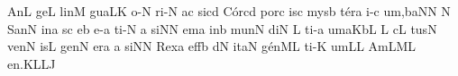 \Internote
\nosolesmescustos
\initiumgregorianum
%
\sgn {}An\punctum L\egn
\sgn ge{}\punctum L\egn
\spatium
\sgn l{i}n\punctum M\egn
\sgn gua\clivis LK\egn
\spatium
{}o{-}\punctum N\egn
\sgn ri{-}\punctum N\egn
{}\pes ac\egn
\sgn si{}\punctum c\augmentum d\egn
\spatium
\divisiominima
\spatium
\sgn C{\'o}r\pes cd\egn
\sgn por\punctum c\egn
\sgn {}is\punctum c\egn
\spatium
\sgn mys\punctum b\egn
\sgn t{\'e}r\punctum a\egn
\sgn {}i{-}\punctum c\egn
\sgn {}u{m,}\climacus baN\augmentum N\egn
\spatium
\divisiominor
\spatium
\custos N
\lineaproxima
\sgn San\punctum N\egn
{}in\punctum a\egn
\sgn {}{\'\i}s\punctum c\egn
{}e{}\punctum b\egn
\spatium
{}e{-}\punctum a\egn
\sgn ti{-}\punctum N\egn
{}\punctum a\egn
\sgn si{}\punctum N\augmentum N\egn
\spatium
\divisiominima
\spatium
em\punctum a\egn
\spatium
\sgn {}in\punctum b\egn
\spatium
\sgn m{u}n\punctum N\egn
\sgn di{}\punctum N\egn
\spatium
{}\punctum L\egn
\sgn ti{-}\punctum a\egn
\sgn {}u{m}\clivis aK\augmentumduplex bL\egn
\spatium
\divisiominor
\spatium
\custos L
\lineaproxima
c\punctum L\egn
\sgn tus\punctum N\egn
\spatium
\sgn v{e}n\punctum N\egn
{}is\punctum L\egn
\spatium
\sgn gen\punctum N\egn
\sgn {}er\punctum a\egn
{}\punctum a\egn
\sgn si{}\punctum N\augmentum N\egn
\spatium
\divisiominima
\spatium
\sgn Rex\punctum a\egn
\spatium
\sgn {}e{ff}\punctum b\egn
{}d\punctum N\egn
\sgn {}it\clivis aN\egn
\spatium
\sgn g{\'e}n\clivis ML\egn
\sgn ti{-}\punctum K\egn
\sgn {}u{m}\punctum L\augmentum L\egn
\spatium
\divisiofinalis
\spatium
\spatium
\sgn {}Am\torculus LML\egn
\sgn {}e{n.}\pes KL\augmentumduplex LJ\egn
\spatium
\Finisgregoriana

\bigskip

\beginlyrics

